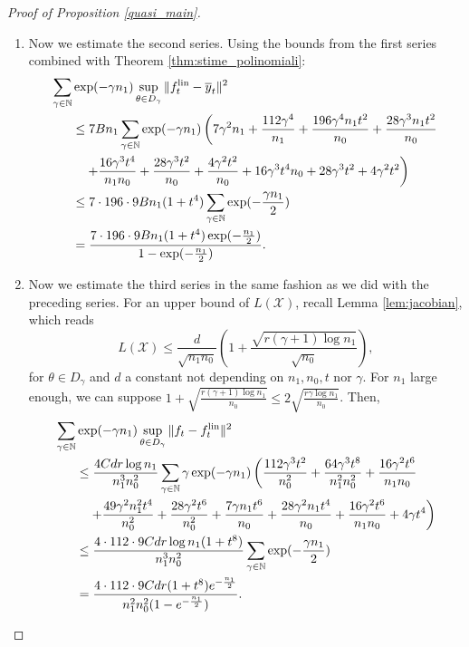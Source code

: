 \documentclass{article}
\theoremstyle{definition}
\theoremstyle{remark}
\numberwithin{equation}{section}
\newcommand{\X}{\mathcal{X}}
\newcommand{\N}{\mathbb{N}}
\newcommand{\lin}{{\textup{lin}}}
\newcommand{\norm}[2]{
    \|#1\|_{#2}
}
\begin{document}
\begin{proof}[Proof of Proposition \ref{quasi_main}]
\begin{enumerate}
        \item Now we estimate the second series.
        Using the bounds from the first series combined with Theorem \ref{thm:stime_polinomiali}:
        \begin{align}
            \sum_{\gamma \in \N}&\exp(-\gamma n_1) \sup_{\theta \in D_\gamma}\norm{f_t^\lin - \overline y_t}{}^2 \\
            &\le 7Bn_1\sum_{\gamma \in \N}\exp(-\gamma n_1) \left(7\gamma^2 n_1+ \frac{112\gamma^4}{n_1}+\frac{196\gamma^4n_1t^2}{n_0}+\frac{28\gamma^3n_1t^2}{n_0}\right.\\
            &\left.\quad +\frac{16\gamma^3t^4}{n_1n_0}+\frac{28\gamma^3 t^2}{n_0} +\frac{4\gamma^2 t^2}{n_0}+16\gamma^3t^4n_0 +28\gamma^3t^2+4\gamma^2t^2\right) \\
            &\le 7\cdot 196\cdot 9Bn_1(1+t^4)\sum_{\gamma \in \N}\exp(-\frac{\gamma n_1}{2}) \\
            &=\frac{7\cdot 196\cdot 9Bn_1(1+t^4)\exp(-\frac{n_1}{2})}{1-\exp(-\frac{n_1}{2})}.
        \end{align}

        \item Now we estimate the third series in the same fashion as we did with the preceding series.
        For an upper bound of $L(\X)$, recall Lemma \ref{lem:jacobian}, which reads 
        \[ L(\X) \le \frac{d}{\sqrt{n_1n_0}}\left(1 + \frac{\sqrt{r(\gamma+1) \log n_1}}{\sqrt{n_0}}\right),
        \] 
        for $\theta \in D_\gamma$ and $d$ a constant not depending on $n_1, n_0, t$ nor $\gamma$.
        For $n_1$ large enough, we can suppose $1 + \sqrt{\frac{r(\gamma+1) \log n_1}{n_0}} \le 2\sqrt{\frac{r\gamma \log n_1}{n_0}}$.
        Then,
        \begin{align}
            \sum_{\gamma \in \N}&\exp(-\gamma n_1) \sup_{\theta \in D_\gamma}\norm{f_t-f^\lin_t}{}^2 \\
            &\le \frac{4Cdr \log n_1}{n_1^3n_0^2}\sum_{\gamma \in \N}\gamma \exp(-\gamma n_1)\left(\frac{112 \gamma^3 t^2}{n_0^2}+\frac{64 \gamma^3t^8}{n_1^2n_0^2}+\frac{16 \gamma^2t^6}{n_1n_0}\right. \\
            &\left.\quad +\frac{49\gamma^2n_1^2t^4}{n_0^2}+\frac{28\gamma^2t^6}{n_0^2}+\frac{7 \gamma n_1t^6}{n_0}+\frac{28\gamma^2n_1t^4}{n_0}+\frac{16 \gamma^2 t^6}{n_1n_0}+4\gamma t^4\right)\\
            &\le \frac{4\cdot 112 \cdot 9Cdr \log n_1(1+t^8)}{n_1^3n_0^2}\sum_{\gamma \in \N}\exp(-\frac{\gamma n_1}{2})\\
            &=\frac{4\cdot 112 \cdot 9Cdr (1+t^8) e^{-\frac{n_1}{2}}}{n_1^2n_0^2(1- e^{-\frac{n_1}{2}})}.
        \end{align}


\end{enumerate}
\end{proof}
\end{document}
